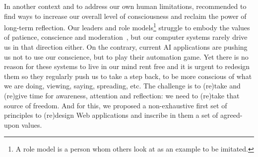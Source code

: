 \documentclass[10pt]{article}
\begin{document}
In another context and to address our own human limitations, \cite{bronner2021} recommended to find ways to increase our overall level of consciousness and reclaim the power of long-term reflection. 
Our leaders and role models\footnote{A role model is a person whom others look at as an example to be imitated.} struggle to embody the values of patience, conscience and moderation~\cite{bronner2021}, but our computer systems rarely drive us in that direction either.
On the contrary, current AI applications are pushing us not to use our conscience, but to play their automation game.
Yet there is no reason for these systems to live in our mind rent free and it is urgent to redesign them so they regularly push us to take a step back, to be more conscious of what we are doing, viewing, saying, spreading, etc. 
The challenge is to (re)take and (re)give time for awareness, attention and reflection: we need to  (re)take that source of freedom. And for this, we proposed a non-exhaustive first set of principles to (re)design Web applications and inscribe in them a set of agreed-upon values.


\printbibliography
\end{document}
